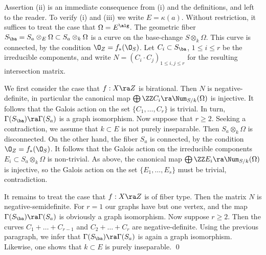 \proof
Assertion (ii) is an immediate consequence from (i) and the definitions, and left to the reader.
To verify (i) and (iii) we write  $E=\kappa(a)$. Without restriction, it suffices to treat the case that $\Omega= E^\alg$.
The geometric fiber $S_\ba=S_a\otimes_E\Omega\subset S_a\otimes_k\Omega$ is a   curve on the base-change $S\otimes_k\Omega$.
This curve is connected, by the condition $\O_Z=f_*(\O_S)$.
Let  $C_i\subset S_\ba$, $1\leq i\leq r$ be the irreducible components, and write $N=(C_i\cdot C_j)_{1\leq i,j\leq r}$
for the resulting intersection matrix.

We first consider   the case that $f:X\ra Z$ is birational. Then $N$ is negative-definite, in particular
the canonical map $\bigoplus\ZZ C_i\ra \Num_{S/k}(\Omega)$ is injective. It follows that the Galois action
on the set $\{C_1,\ldots,C_r\}$ is trivial. In turn, $\Gamma(S_\ba)\ra\Gamma(S_a)$ is a graph isomorphism.
Now suppose that $r\geq 2$. Seeking a contradiction, we assume that $k\subset E$ is not purely inseparable.
Then $S_a\otimes_k\Omega$ is disconnected. On the other hand, the fiber $S_a$ is connected,
 by the condition $\O_Z=f_*(\O_S)$.
It follows that the Galois action on the   irreducible components $E_i\subset S_a\otimes_k\Omega$
is non-trivial.
As above, the canonical map $\bigoplus\ZZ E_i\ra\Num_{S/k}(\Omega)$ is injective, so the Galois action on
the set $\{E_1,\ldots,E_s\}$ must be trivial, contradiction.

It remains to treat the case that  $f:X\ra Z $ is of fiber type. Then the matrix $N$ is negative-semidefinite.
For $r=1$ our graphs have but one vertex, and the map $\Gamma(S_\ba)\ra\Gamma(S_a)$ is obviously a graph isomorphism.
Now suppose  $r\geq 2$. Then  the curves $C_1+\ldots+C_{r-1}$ and $C_2+\ldots+C_r$ are negative-definite. Using the
previous paragraph,
we infer that $\Gamma(S_\ba)\ra\Gamma(S_a)$ is again a graph isomorphism. Likewise, one shows that
 $k\subset E$ is purely inseparable.
\qed


